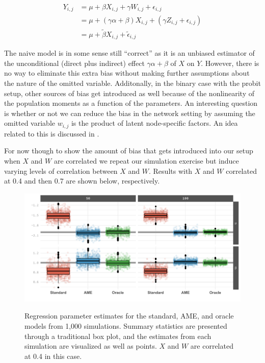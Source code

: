 \begin{align*}
  Y_{i,j} & = \mu + \beta X_{i,j} + \gamma W_{i,j} + \epsilon_{i,j} \\
  &= \mu + (\gamma \alpha+\beta ) X_{i,j} + (\gamma Z_{i,j} + \epsilon_{i,j})  \\
  &= \mu + \tilde \beta X_{i,j} + \tilde \epsilon_{i,j}
\end{align*}

The naive model is in some sense still ``correct'' as it is an unbiased estimator of the unconditional (direct plus indirect) effect $\gamma\alpha + \beta$ of $X$ on $Y$. However, there is no way to eliminate this extra bias without making further assumptions about the nature of the omitted variable. Additonally, in the binary case with the probit setup, other sources of bias get introduced as well because of the nonlinearity of the population moments as a function of the parameters. An interesting question is whether or not we can reduce the bias in the network setting by assuming the omitted variable $w_{i,j}$ is the product of latent node-specific factors. An idea related to this is discussed in \citet{minhas:etal:2017:arxiv}.

For now though to show the amount of bias that gets introduced into our setup when $X$ and $W$ are correlated we repeat our simulation exercise but induce varying levels of correlation between $X$ and $W$. Results with $X$ and $W$ correlated at 0.4 and then 0.7 are shown below, respectively.

\begin{figure}[ht]
\caption{Regression parameter estimates for the standard, AME, and oracle models from 1,000 simulations. Summary statistics are presented through a traditional box plot, and the estimates from each simulation are visualized as well as points. $X$ and $W$ are correlated at 0.4 in this case.}
\label{fig:ameBias_corrMed}
\includegraphics[width=1\textwidth]{graphics/ameSimBias_all_corrProbitMed.pdf} \\
\end{figure}

